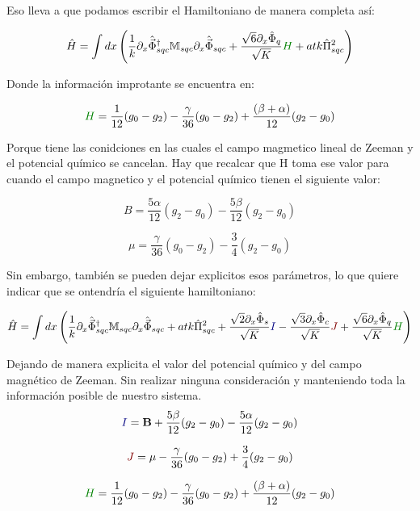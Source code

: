 Eso lleva a que podamos escribir el Hamiltoniano de manera completa así:

\begin{equation}
    \hat{H} = \int dx \left(     \frac{1}{k} \partial_x  \hat{\vec{\Phi}}_{sqc}^{\dagger}  \mathbb{M}_{sqc}  \partial_x  \hat{\vec{\Phi}}_{sqc} + \frac{\sqrt{6} \partial_x \hat{\Phi}_{q}}{\sqrt{K}} \textcolor{mygreen}{H} + atk\hat{\Pi}_{sqc}^{2}  \right)
\end{equation}

Donde la información improtante se encuentra en:

\begin{equation}
    \textcolor{mygreen}{H} = \frac{1}{12}  (g_0-g_2) - \frac{\gamma}{36}  (g_0-g_2) + \frac{(\beta + \alpha)}{12} (g_2-g_0)   
\end{equation}

Porque tiene las conidciones en las cuales el campo magmetico lineal de Zeeman y el potencial químico se cancelan. Hay que recalcar que H toma ese valor para cuando el campo magnetico y el potencial químico tienen el siguiente valor:

\begin{equation}
    B= \frac{5\alpha}{12} (g_2-g_0) - \frac{5\beta}{12}  (g_2-g_0)
\end{equation}

\begin{equation}
    \mu = \frac{\gamma}{36}  (g_0-g_2) -\frac{3}{4}  (g_2-g_0) 
\end{equation}


Sin embargo, también se pueden dejar explicitos esos parámetros, lo que quiere indicar que se ontendría el siguiente hamiltoniano:

\begin{equation}
    \hat{H} = \int dx \left(     \frac{1}{k} \partial_x  \hat{\vec{\Phi}}_{sqc}^{\dagger}  \mathbb{M}_{sqc}  \partial_x  \hat{\vec{\Phi}}_{sqc} + atk\hat{\Pi}_{sqc}^{2} + \frac{\sqrt{2} \partial_x \hat{\Phi}_{s}}{\sqrt{K}} \textcolor{myblue}{I}  - \frac{\sqrt{3} \partial_x \hat{\Phi}_{c}}{\sqrt{K}} \textcolor{myred}{J}  + \frac{\sqrt{6} \partial_x \hat{\Phi}_{q}}{\sqrt{K}} \textcolor{mygreen}{H}   \right)
\end{equation}

Dejando de manera explicita el valor del potencial químico y del campo magnético de Zeeman. Sin realizar ninguna consideración y manteniendo toda la información posible de nuestro sistema.
\begin{equation}
    \textcolor{myblue}{I} = \mathbf{B} +  \frac{5\beta}{12}  (g_2-g_0) - \frac{5\alpha}{12} (g_2-g_0) 
\end{equation}

\begin{equation}
    \textcolor{myred}{J} = \mathbf{\mu} - \frac{\gamma}{36}  (g_0-g_2) + \frac{3}{4}  (g_2-g_0)
\end{equation}

\begin{equation}
    \textcolor{mygreen}{H} = \frac{1}{12}  (g_0-g_2) - \frac{\gamma}{36}  (g_0-g_2) + \frac{(\beta + \alpha)}{12} (g_2-g_0)   
\end{equation}